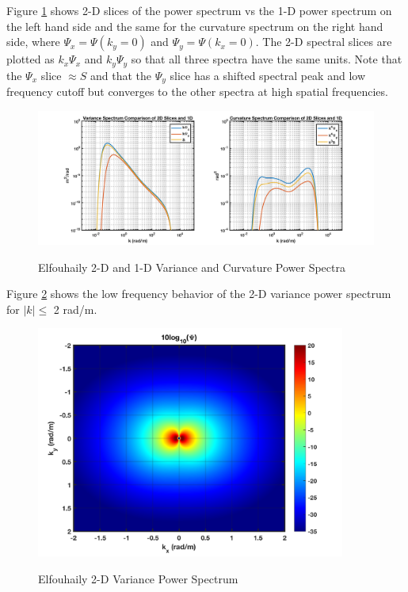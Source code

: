 Figure \ref{os_fig:7bc} shows 2-D slices of the power spectrum vs the 1-D power spectrum on the left hand side and the same for the curvature spectrum on the right hand side, where $\Psi_x = \Psi(k_y = 0)$ and $\Psi_y = \Psi(k_x = 0)$. The 2-D spectral slices are plotted as $k_x\Psi_x$ and $k_y\Psi_y$ so that all three spectra have the same units. Note that the $\Psi_x$ slice $\approx S$ and that the $\Psi_y$ slice has a shifted spectral peak and low frequency cutoff but converges to the other spectra at high spatial frequencies.
\begin{figure}[H]
  \begin{center}
\includegraphics[width=6in]{../media/Ocean_Surface/elf_variance_curvature_spectrum_2D_slices.png}
  \end{center}
  \renewcommand{\baselinestretch}{1} \small\normalsize
  \begin{quote}
    \caption[Elfouhaily 2-D and 1D Variance and Curvature Power Spectra]{Elfouhaily 2-D and 1-D Variance and Curvature Power Spectra\label{os_fig:7bc}}
  \end{quote}
\end{figure}
\renewcommand{\baselinestretch}{2} \small\normalsize

Figure \ref{os_fig:7cc} shows the low frequency behavior of the 2-D variance power spectrum for $|k| \leq$ 2 rad/m.
\begin{figure}[H]
  \begin{center}
\includegraphics[width=4in]{../media/Ocean_Surface/elf_variance_spectrum_2D_zoom.png}
  \end{center}
  \renewcommand{\baselinestretch}{1} \small\normalsize
  \begin{quote}
    \caption[Elfouhaily 2-D Variance Power Spectrum]{Elfouhaily 2-D Variance Power Spectrum\label{os_fig:7cc}}
  \end{quote}
\end{figure}
\renewcommand{\baselinestretch}{2} \small\normalsize

